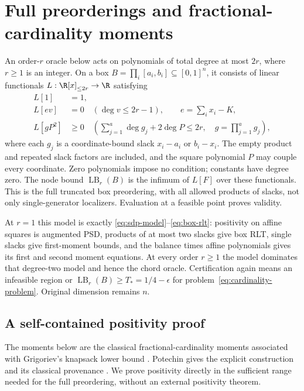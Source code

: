 \section{Full preorderings and fractional-cardinality moments}
\label{sec:cardinality-preordering}
An order-$r$ oracle below acts on polynomials of total degree at most
$2r$, where $r\ge1$ is an integer. On a box
$B=\prod_i[a_i,b_i]\subseteq[0,1]^n$, it consists of linear functionals
$L:\R[x]_{\le2r}\to\R$ satisfying
\begin{align}
 L[1]&=1,\label{eq:preorder-normalization}\\
 L[e v]&=0\quad(\deg v\le2r-1),\qquad
 e=\sum_i x_i-K,\label{eq:preorder-equality}\\
 L[g P^2]&\ge0\quad
 \left(\sum_{j=1}^a\deg g_j+2\deg P\le2r,\quad
 g=\prod_{j=1}^a g_j\right),\label{eq:preorder-positivity}
\end{align}
where each $g_j$ is a coordinate-bound slack $x_i-a_i$ or $b_i-x_i$.
The empty product and repeated slack factors are included, and the square
polynomial $P$ may couple every coordinate. Zero polynomials impose no
condition; constants have degree zero. The node bound
$\operatorname{LB}_r(B)$ is the infimum of $L[F]$ over these functionals.
This is the full truncated box preordering, with all allowed products
of slacks, not only single-generator localizers. Evaluation at a feasible
point proves validity.

At $r=1$ this model is exactly
\eqref{eq:sdp-model}--\eqref{eq:box-rlt}: positivity on affine squares
is augmented PSD, products of at most two slacks give box RLT, single
slacks give first-moment bounds, and the balance times affine polynomials
gives its first and second moment equations. At every order $r\ge1$ the
model dominates that degree-two model and hence the chord oracle.
Certification again means an infeasible region or
$\operatorname{LB}_r(B)\ge T_*=1/4-\epsilon$ for
problem~\eqref{eq:cardinality-problem}. Original dimension remains $n$.

\subsection{A self-contained positivity proof}
The moments below are the classical fractional-cardinality moments
associated with Grigoriev's knapsack lower bound
\citep{Grigoriev2001}. Potechin gives the explicit construction and its
classical provenance \citep[Theorem 1, Example 18, Theorem 44]{Potechin2019}.
We prove positivity directly in the sufficient range needed for the full
preordering, without an external positivity theorem.

